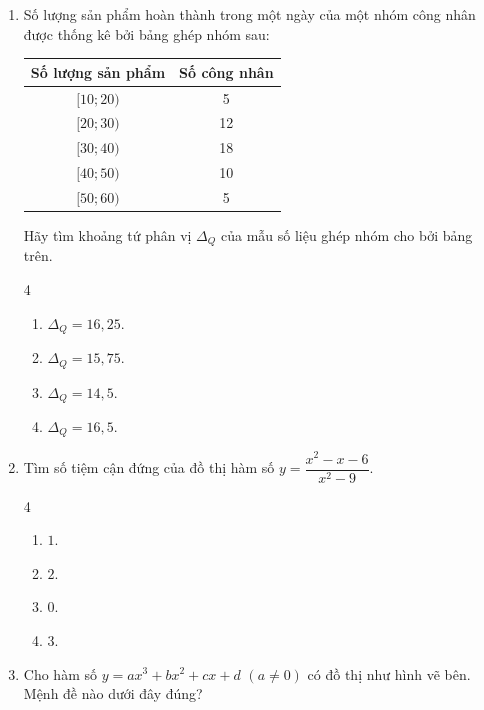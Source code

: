 \documentclass[12pt]{article}
\begin{document}
\begin{enumerate}[label=\textbf{Câu \arabic*.}, leftmargin=*]
		\item Số lượng sản phẩm hoàn thành trong một ngày của một nhóm công nhân được thống kê bởi bảng ghép nhóm sau:
		\begin{center}
			\begin{tabular}{|c|c|}
				\hline
				\textbf{Số lượng sản phẩm} & \textbf{Số công nhân} \\
				\hline
				$[10; 20)$ & 5 \\
				\hline
				$[20; 30)$ & 12 \\
				\hline
				$[30; 40)$ & 18 \\
				\hline
				$[40; 50)$ & 10 \\
				\hline
				$[50; 60)$ & 5 \\
				\hline
			\end{tabular}
		\end{center}
		Hãy tìm khoảng tứ phân vị $\Delta_Q$ của mẫu số liệu ghép nhóm cho bởi bảng trên.
		\begin{multicols}{4}
			\begin{enumerate}[label=\Alph*.]
				\item $\Delta_Q = 16,25$.
				\item $\Delta_Q = 15,75$.
				\item $\Delta_Q = 14,5$.
				\item $\Delta_Q = 16,5$.
			\end{enumerate}
		\end{multicols}
		
		\item Tìm số tiệm cận đứng của đồ thị hàm số $y = \dfrac{x^2 - x - 6}{x^2 - 9}$.
		\begin{multicols}{4}
			\begin{enumerate}[label=\Alph*.]
				\item $1$.
				\item $2$.
				\item $0$.
				\item $3$.
			\end{enumerate}
		\end{multicols}
		
		\item Cho hàm số $y = ax^3 + bx^2 + cx + d$ $(a \neq 0)$ có đồ thị như hình vẽ bên. Mệnh đề nào dưới đây đúng?
		\begin{center}
\end{center}
\end{enumerate}
\end{document}
